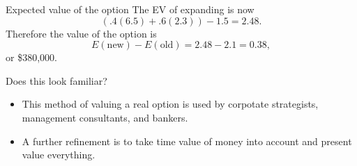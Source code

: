 \documentclass{beamer}\usepackage[]{graphicx}\usepackage[]{color}
\begin{document}
\begin{darkframes}
    \begin{frame}[fragile]{Expected value of the option}
        The EV of expanding is now 
        \[ (.4(6.5) + .6(2.3)) - 1.5 = 2.48. \]
        \pause
        Therefore the value of the option is
        \[ E(\text{new}) - E(\text{old}) = 2.48 - 2.1 = 0.38, \] 
        or \$380,000.
    \end{frame}


    \begin{frame}[fragile]{Does this look familiar?}
      \begin{itemize}[<+->]
        \item This method of valuing a real option is used by corpotate strategists, management consultants, and bankers. 
        \item A further refinement is to take time value of money into account and present value everything.
      \end{itemize}
    \end{frame}
  \end{darkframes}
\end{document}
